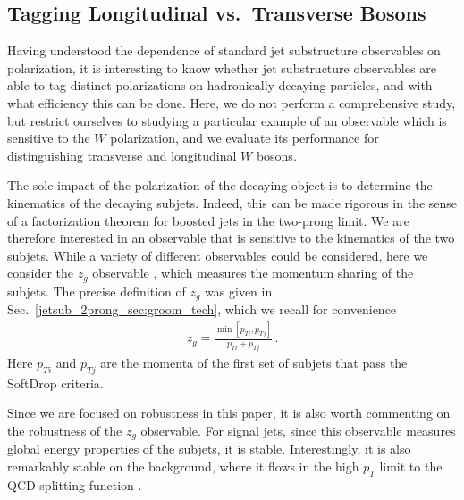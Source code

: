 \documentclass[11pt]{cernrep}
\begin{document}
\subsection{Tagging Longitudinal vs.\ Transverse Bosons}\label{jetsub_2prong_sec:polar_tag}

Having understood the dependence of standard jet substructure observables on polarization, it is interesting to know whether jet substructure observables are able to tag distinct polarizations on hadronically-decaying particles, and with what efficiency this can be done.
%
%
Here, we do not perform a comprehensive study, but restrict ourselves to studying a particular example of an observable which is sensitive to the $W$ polarization, and we evaluate its performance for distinguishing transverse and longitudinal $W$ bosons. 

The sole impact of the polarization of the decaying object is to determine the kinematics of the decaying subjets.
%
Indeed, this can be made rigorous in the sense of a factorization theorem for boosted jets in the two-prong limit.
%
We are therefore interested in an observable that is sensitive to the kinematics of the two subjets.
%
While a variety of different observables could be considered, here we consider the $z_g$ observable \cite{Larkoski:2014wba,Larkoski:2014bia,Larkoski:2015lea}, which measures the momentum sharing of the subjets. The precise definition of $z_g$ was given in Sec.~\ref{jetsub_2prong_sec:groom_tech}, which we recall for convenience
\begin{align}
z_g=\frac{\min\left[ p_{Ti}, p_{Tj}  \right]}{p_{Ti}+p_{Tj}}\,.
\end{align}
Here $p_{Ti}$ and $p_{Tj}$ are the momenta of the first set of subjets that pass the SoftDrop criteria.


Since we are focused on robustness in this paper, it is also worth commenting on the robustness of the $z_g$ observable. For signal jets, since this observable measures global energy properties of the subjets, it is stable.
%
Interestingly, it is also remarkably stable on the background, where it flows in the high $p_T$ limit to the QCD splitting function \cite{Larkoski:2014wba,Larkoski:2014bia,Larkoski:2015lea}.
\end{document}
